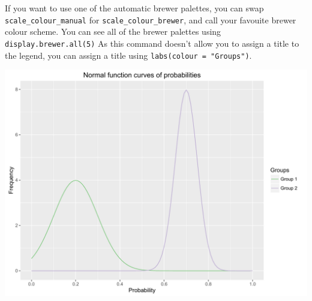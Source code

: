 If you want to use one of the automatic brewer palettes, you can swap
\texttt{scale\_colour\_manual} for \texttt{scale\_colour\_brewer}, and
call your favouite brewer colour scheme. You can see all of the brewer
palettes using \texttt{display.brewer.all(5)} As this command doesn't
allow you to assign a title to the legend, you can assign a title using
\texttt{labs(colour\ =\ "Groups")}.

\begin{Shaded}
\begin{Highlighting}[]
\StringTok{ }\NormalTok{(}\NormalTok{(} \NormalTok{(}\NormalTok{, }\NormalTok{)), }\NormalTok{(} 
\StringTok{      }\NormalTok{(}  \NormalTok{(}\NormalTok{, }\NormalTok{),}
\StringTok{      }\NormalTok{(} \NormalTok{)) +}
\StringTok{      }\NormalTok{(}  \NormalTok{(}\NormalTok{, }\NormalTok{),}
\StringTok{      }\NormalTok{(} \NormalTok{)) +}
\StringTok{      }\NormalTok{(} \NormalTok{,}  \NormalTok{(}\NormalTok{, }\NormalTok{, }\NormalTok{),}
\StringTok{        }\NormalTok{(}\NormalTok{, }\NormalTok{)) +}
\StringTok{      }\NormalTok{(} \NormalTok{) +}
\StringTok{      }\NormalTok{(}\NormalTok{) +}
\StringTok{      }\NormalTok{(}\NormalTok{) +}
\StringTok{      }\NormalTok{(} \NormalTok{)}
\end{Highlighting}
\end{Shaded}

\begin{center}\includegraphics[width=0.55\linewidth]{figures/function_11-1} \end{center}


